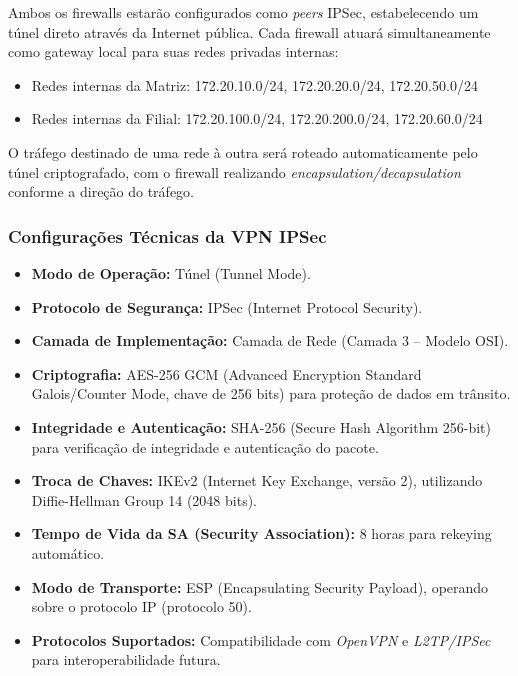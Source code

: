 \documentclass[a4paper, 12pt]{article}
\begin{document}
Ambos os firewalls estarão configurados como \textit{peers} IPSec, estabelecendo um túnel direto através da Internet pública. Cada firewall atuará simultaneamente como gateway local para suas redes privadas internas:
\begin{itemize}
    \item Redes internas da Matriz: 172.20.10.0/24, 172.20.20.0/24, 172.20.50.0/24
    \item Redes internas da Filial: 172.20.100.0/24, 172.20.200.0/24, 172.20.60.0/24
\end{itemize}

O tráfego destinado de uma rede à outra será roteado automaticamente pelo túnel criptografado, com o firewall realizando \textit{encapsulation/decapsulation} conforme a direção do tráfego.

\subsubsection{Configurações Técnicas da VPN IPSec}
\label{subsubsec:vpn-config}

\begin{itemize}
    \item \textbf{Modo de Operação:} Túnel (Tunnel Mode).
    \item \textbf{Protocolo de Segurança:} IPSec (Internet Protocol Security).
    \item \textbf{Camada de Implementação:} Camada de Rede (Camada 3 – Modelo OSI).
    \item \textbf{Criptografia:} AES-256 GCM (Advanced Encryption Standard Galois/Counter Mode, chave de 256 bits) para proteção de dados em trânsito.
    \item \textbf{Integridade e Autenticação:} SHA-256 (Secure Hash Algorithm 256-bit) para verificação de integridade e autenticação do pacote.
    \item \textbf{Troca de Chaves:} IKEv2 (Internet Key Exchange, versão 2), utilizando Diffie-Hellman Group 14 (2048 bits).
    \item \textbf{Tempo de Vida da SA (Security Association):} 8 horas para rekeying automático.
    \item \textbf{Modo de Transporte:} ESP (Encapsulating Security Payload), operando sobre o protocolo IP (protocolo 50).
    \item \textbf{Protocolos Suportados:} Compatibilidade com \textit{OpenVPN} e \textit{L2TP/IPSec} para interoperabilidade futura.
\end{itemize}
\end{document}
